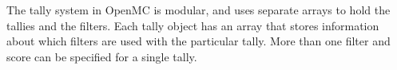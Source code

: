 \documentclass[10pt]{article}
\numberwithin{equation}{section} %
\begin{document}

The tally system in OpenMC is modular, and uses separate arrays to hold the tallies and the filters. Each tally object has an array that stores information about which filters  are used with the particular tally. More than one filter and score can be specified for a single tally. 
\end{document}
